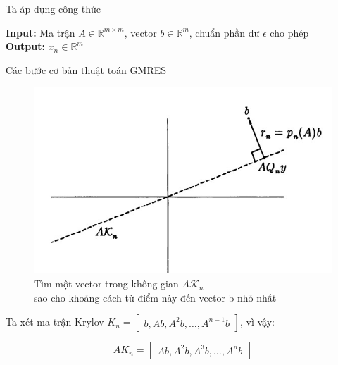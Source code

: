 \documentclass[14pt, a4paper]{article}
\numberwithin{equation}{section}
\numberwithin{algorithm}{section}
\numberwithin{figure}{section}
\numberwithin{dl}{section}
\numberwithin{md}{section}
\numberwithin{bd}{section}
\numberwithin{dn}{section}
\begin{document}
Ta áp dụng công thức
\begin{algorithm}
    \hspace*{\algorithmicindent} \textbf{Input:} {Ma trận $A \in \mathbb{R}^{m \times m}$, vector $b \in \mathbb{R}^m$, chuẩn phần dư $\epsilon$ cho phép} \\
    \hspace*{\algorithmicindent} \textbf{Output:} {$x_n \in \mathbb{R}^m$}
    \caption{Các bước cơ bản thuật toán GMRES}\label{alg:GMRES}
    \begin{algorithmic}
        \EndFor
    \end{algorithmic}
\end{algorithm}

\begin{figure}[h!] \centering

    \includegraphics[scale=0.8]{GMRES-LS.jpg}
    \caption{Tìm một vector trong không gian $A \mathcal{K}_n$ \\ sao cho khoảng cách từ điểm này đến vector b nhỏ nhất}

    \label{fig:GMRES-LS}
\end{figure}

Ta xét ma trận Krylov $K_n = \begin{bmatrix} b, Ab, A^2b, \dots, A^{n-1}b \end{bmatrix}$, vì vậy:

\begin{equation}
    A K_n = \begin{bmatrix} Ab, A^2b, A^3b, \dots, A^nb \end{bmatrix}
\end{equation}
\end{document}
